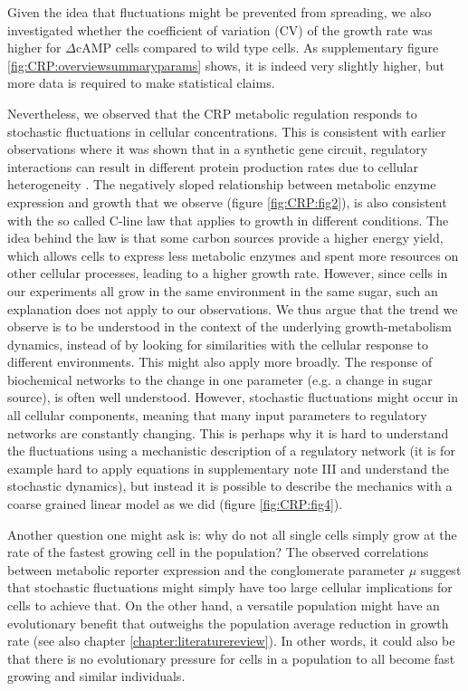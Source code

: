Given the idea that fluctuations might be prevented from spreading, 
we also investigated whether the coefficient of variation (CV) of the growth rate was higher for $\Delta$cAMP cells compared to wild type cells.
%
As supplementary figure \ref{fig:CRP:overviewsummaryparams} shows, it is indeed very slightly higher, but more data is required to make statistical claims.


Nevertheless, we observed that the CRP metabolic regulation responds to stochastic fluctuations in cellular concentrations.
%
This is consistent with earlier observations where it was shown that 
in a synthetic gene circuit, 
regulatory interactions can result in different protein production rates due to cellular heterogeneity \cite{Rosenfeld2005}.
%
The negatively sloped relationship between metabolic enzyme expression and growth that we observe (figure \ref{fig:CRP:fig2}), 
is also consistent with the so called C-line law \cite{You2013} that applies to growth in different conditions.
%
The idea behind the law is that some carbon sources provide a higher energy yield, which allows cells to express less metabolic enzymes and spent more resources on other cellular processes, leading to a higher growth rate.
%
However, since cells in our experiments all grow in the same environment in the same sugar, such an explanation does not apply to our observations.
%
We thus argue that the trend we observe is to be understood in the context of the underlying growth-metabolism dynamics, 
instead of by looking for similarities with the cellular response to different environments.
% 
This might also apply more broadly. 
%
The response of biochemical networks to the change in one parameter (e.g. a change in sugar source), is often well understood.
%
However, stochastic fluctuations might occur in all cellular components, meaning that many input parameters to regulatory networks are constantly changing.
%
This is perhaps why it is hard to understand the fluctuations 
using a mechanistic description of a regulatory network
(it is for example hard to apply equations in supplementary note III and understand the stochastic dynamics), 
but instead it is possible to describe the mechanics with a coarse grained linear model as we did (figure \ref{fig:CRP:fig4}).


Another question one might ask is: why do not all single cells simply grow at the rate of the fastest growing cell in the population?
%
The observed correlations between metabolic reporter expression and the 
conglomerate parameter $\mu$ 
suggest that stochastic fluctuations might simply have too large cellular implications for cells to achieve that.
%
On the other hand, a versatile population might have an evolutionary benefit that outweighs the population average reduction in growth rate (see also chapter \ref{chapter:literaturereview}).
%
In other words, it could also be that there is no evolutionary pressure for cells in a population to all become fast growing and similar individuals.

